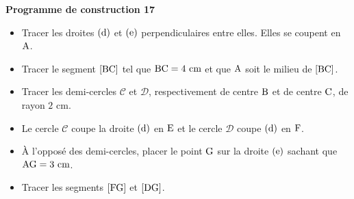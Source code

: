 \documentclass[exercice,a4]{thedocument}%
\begin{document}
%
\noindent\textbf{Programme de construction 17}\par\smallskip\noindent
\begin{itemize}
    \item Tracer les droites $(\text{d})$ et $(\text{e})$
    perpendiculaires entre elles. Elles se coupent en $\text{A}$.
    \item Tracer le segment $[\text{BC}]$ tel que
    $\text{BC}=4\text{ cm}$ et que $\text{A}$ soit le milieu
    de $[\text{BC}]$.
    \item Tracer les demi-cercles $\mathcal{C}$ et $\mathcal{D}$,
    respectivement de centre $\text{B}$ et de centre
    $\text{C}$, de rayon $2\text{ cm}$.
    \item Le cercle $\mathcal{C}$ coupe la droite $(\text{d})$ en
    $\text{E}$ et le cercle $\mathcal{D}$ coupe $(\text{d})$
    en $\text{F}$.
    \item À l'opposé des demi-cercles, placer le point $\text{G}$ sur
    la droite $(\text{e})$ sachant que $\text{AG}=3\text{ cm}$.
    \item Tracer les segments $[\text{FG}]$ et $[\text{DG}]$.
\end{itemize}
\end{document}
